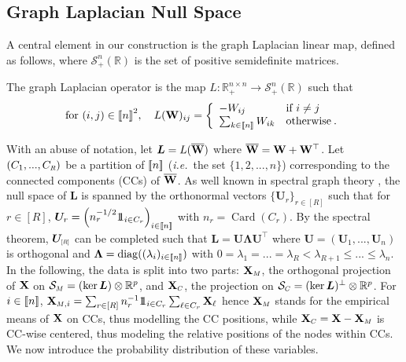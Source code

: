 \subsection{Graph Laplacian Null Space}\label{sec:laplacian_prop}
A central element in our construction is the graph Laplacian linear map, defined as follows, where $\mathcal{S}^n_+(\mathbb{R})$ is the set of positive semidefinite matrices.
\begin{definition}\label{graph_laplacian}
The graph Laplacian operator is the map $L \colon \mathbb{R}_+^{n \times n} \to \mathcal{S}^n_+(\mathbb{R})$ such that
$$\text{for } (i,j) \in {[\![n]\!]}^2, \quad L(\mathbf{W})_{ij} = \left\{
\begin{array}{ll}
    - W_{ij} & \text{if } i \neq j \\
    \sum_{k \in {[\![n]\!]}} W_{ik} & \text{otherwise} \:.
\end{array} 
\right. $$
\end{definition}
With an abuse of notation, let $\bm{L} = L(\overline{\mathbf{W}})$ where $\overline{\mathbf{W}} = \mathbf{W} + \mathbf{W}^\top$. Let $(C_1,...,C_{\scaleto{R}{4pt}})$ be a partition of ${[\![n]\!]}$ (\textit{i.e.}\ the set $\{1,2,...,n\}$) corresponding to the connected components (CCs) of $\overline{\mathbf{W}}$. As well known in spectral graph theory \cite{Chung97}, the null space of $\bm{L}$ is spanned by the orthonormal vectors $\{\bm{U}_{r}\}_{r \in [R]}$ such that for $r \in [R]$,
$\bm{U}_{r} = \left(n_r^{-1/2} 1\!\!1_{i \in C_r}\right)_{i \in {[\![n]\!]}}$ with $n_r = \operatorname{Card}(C_r)$. By the spectral theorem, $\bm{U}_{\scaleto{[R]}{5pt}}$ can be completed such that $\bm{L} = \bm{U \Lambda U^\top}$ where $\bm{U} = (\bm{U}_1, ..., \bm{U}_n)$ is orthogonal and $\bm{\Lambda} = \operatorname{diag}((\lambda_i)_{i \in {[\![n]\!]}})$ with $0 = \lambda_1 = ... = \lambda_R < \lambda_{R+1} \leq ... \leq \lambda_n$. In the following, the data is split into two parts: $\Xb_{\scaleto{M}{4pt}}$, the orthogonal projection of $\mathbf{X}$ on $\mathcal{S}_{\scaleto{M}{4pt}} = (\ker \bm{L}) \otimes \mathbb{R}^p$, and $\Xb_{\scaleto{C}{4pt}}$, the projection on $\mathcal{S}_{\scaleto{C}{4pt}} = (\ker \bm{L})^{\perp} \otimes \mathbb{R}^p$. For $i \in {[\![n]\!]}$, $\Xb_{\scaleto{M}{4pt},i} = \sum_{r \in [R]} n_r^{-1} \ind_{i \in C_r}\sum_{\ell \in C_r} \Xb_{\ell} $ hence $\Xb_{\scaleto{M}{4pt}}$ stands for the empirical means of $\mathbf{X}$ on CCs, thus modelling the CC positions, while $\Xb_{\scaleto{C}{4pt}} = \Xb - \Xb_{\scaleto{M}{4pt}}$ is CC-wise centered, thus modeling the relative positions of the nodes within CCs. We now introduce the probability distribution of these variables.

